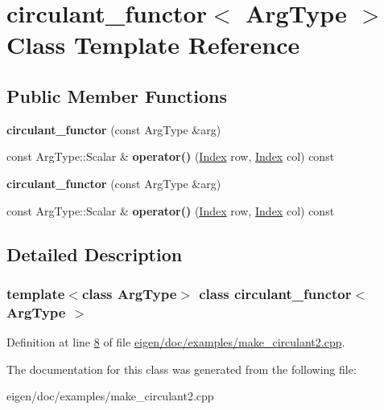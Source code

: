 \hypertarget{classcirculant__functor}{}\section{circulant\+\_\+functor$<$ Arg\+Type $>$ Class Template Reference}
\label{classcirculant__functor}
\subsection*{Public Member Functions}
\begin{DoxyCompactItemize}
\item 
\mbox{\label{classcirculant__functor_a17851a782beb58b674cc26dfe6b884b0}} 
{\bfseries circulant\+\_\+functor} (const Arg\+Type \&arg)
\item 
\mbox{\label{classcirculant__functor_aabead56f9ad72ae3759a2ffac6177540}} 
const Arg\+Type\+::\+Scalar \& {\bfseries operator()} (\hyperlink{namespace_eigen_a62e77e0933482dafde8fe197d9a2cfde}{Index} row, \hyperlink{namespace_eigen_a62e77e0933482dafde8fe197d9a2cfde}{Index} col) const
\item 
\mbox{\label{classcirculant__functor_a17851a782beb58b674cc26dfe6b884b0}} 
{\bfseries circulant\+\_\+functor} (const Arg\+Type \&arg)
\item 
\mbox{\label{classcirculant__functor_aabead56f9ad72ae3759a2ffac6177540}} 
const Arg\+Type\+::\+Scalar \& {\bfseries operator()} (\hyperlink{namespace_eigen_a62e77e0933482dafde8fe197d9a2cfde}{Index} row, \hyperlink{namespace_eigen_a62e77e0933482dafde8fe197d9a2cfde}{Index} col) const
\end{DoxyCompactItemize}


\subsection{Detailed Description}
\subsubsection*{template$<$class Arg\+Type$>$\newline
class circulant\+\_\+functor$<$ Arg\+Type $>$}



Definition at line \hyperlink{eigen_2doc_2examples_2make__circulant2_8cpp_source_l00008}{8} of file \hyperlink{eigen_2doc_2examples_2make__circulant2_8cpp_source}{eigen/doc/examples/make\+\_\+circulant2.\+cpp}.



The documentation for this class was generated from the following file\+:\begin{DoxyCompactItemize}
\item 
eigen/doc/examples/make\+\_\+circulant2.\+cpp\end{DoxyCompactItemize}
